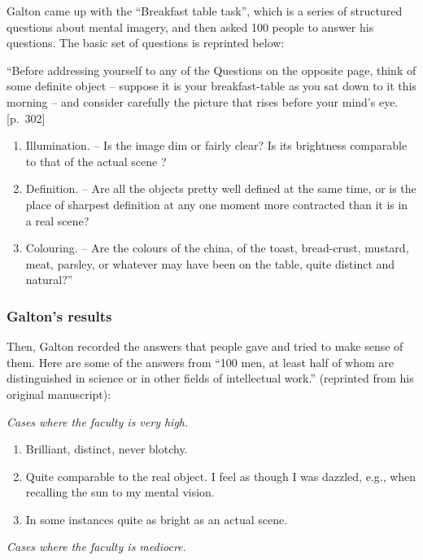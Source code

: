 \documentclass[
  oneside,
  12pt]{crumpbook}
\providecommand{\tightlist}{%
  \setlength{\itemsep}{0pt}\setlength{\parskip}{0pt}}
\begin{document}
Galton came up with the ``Breakfast table task'', which is a series of structured questions about mental imagery, and then asked 100 people to answer his questions. The basic set of questions is reprinted below:

``Before addressing yourself to any of the Questions on the opposite page, think of some definite object -- suppose it is your breakfast-table as you sat down to it this morning -- and consider carefully the picture that rises before your mind's eye. {[}p.~302{]}

\begin{enumerate}
\def\labelenumi{\arabic{enumi}.}
\tightlist
\item
  Illumination. -- Is the image dim or fairly clear? Is its brightness comparable to that of the actual scene ?
\item
  Definition. -- Are all the objects pretty well defined at the same time, or is the place of sharpest definition at any one moment more contracted than it is in a real scene?
\item
  Colouring. -- Are the colours of the china, of the toast, bread-crust, mustard, meat, parsley, or whatever may have been on the table, quite distinct and natural?''
\end{enumerate}

\hypertarget{galtons-results}{%
\subsubsection{Galton's results}\label{galtons-results}}

Then, Galton recorded the answers that people gave and tried to make sense of them. Here are some of the answers from ``100 men, at least half of whom are distinguished in science or in other fields of intellectual work.'' (reprinted from his original manuscript):

\emph{Cases where the faculty is very high.}

\begin{enumerate}
\def\labelenumi{\arabic{enumi}.}
\item
  Brilliant, distinct, never blotchy.
\item
  Quite comparable to the real object. I feel as though I was dazzled, e.g., when recalling the sun to my mental vision.
\item
  In some instances quite as bright as an actual scene.
\end{enumerate}

\emph{Cases where the faculty is mediocre.}
\end{document}
